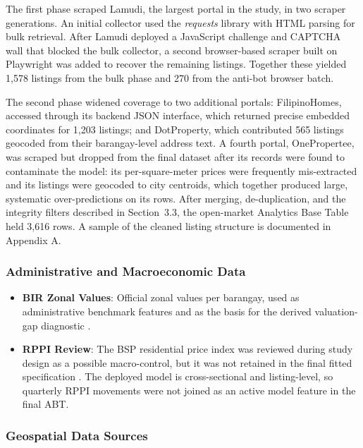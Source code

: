 The first phase scraped Lamudi, the largest portal in the study, in two scraper generations. An initial collector used the \emph{requests} library with HTML parsing for bulk retrieval. After Lamudi deployed a JavaScript challenge and CAPTCHA wall that blocked the bulk collector, a second browser-based scraper built on Playwright was added to recover the remaining listings. Together these yielded 1{,}578 listings from the bulk phase and 270 from the anti-bot browser batch.

The second phase widened coverage to two additional portals: FilipinoHomes, accessed through its backend JSON interface, which returned precise embedded coordinates for 1{,}203 listings; and DotProperty, which contributed 565 listings geocoded from their barangay-level address text. A fourth portal, OnePropertee, was scraped but dropped from the final dataset after its records were found to contaminate the model: its per-square-meter prices were frequently mis-extracted and its listings were geocoded to city centroids, which together produced large, systematic over-predictions on its rows. After merging, de-duplication, and the integrity filters described in Section~3.3, the open-market Analytics Base Table held 3{,}616 rows. A sample of the cleaned listing structure is documented in Appendix A.

\subsubsection{Administrative and Macroeconomic Data}\label{administrative-and-macroeconomic-data}

\begin{itemize}
\item \textbf{BIR Zonal Values}: Official zonal values per barangay, used as administrative benchmark features and as the basis for the derived valuation-gap diagnostic \parencite{bir_nd}.
\item \textbf{RPPI Review}: The BSP residential price index was reviewed during study design as a possible macro-control, but it was not retained in the final fitted specification \parencite{bsp2025}. The deployed model is cross-sectional and listing-level, so quarterly RPPI movements were not joined as an active model feature in the final ABT.
\end{itemize}

\subsubsection{Geospatial Data Sources}\label{geospatial-data-sources}

